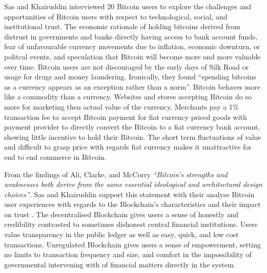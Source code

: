 \documentclass[12pt]{article} %
\begin{document}
Sas and Khairuddin interviewed 20 Bitcoin users to explore the challenges and opportunities of Bitcoin users with respect to technological, social, and institutional trust\cite{sas2016design}. The economic rationale of holding bitcoins derived from distrust in governments and banks directly having access to bank account funds, fear of unfavourable currency movements due to inflation, economic downturn, or politcal events, and speculation that Bitcoin will become more and more valuable over time. Bitcoin users are not discouraged by the early days of Silk Road or usage for drugs and money laundering. Ironically, they found ``spending bitcoins as a currency appears as an exception rather than a norm''. Bitcoin behaves more like a commodity than a currency. Websites and stores accepting Bitcoin do so more for marketing then actual value of the currency. Merchants pay a 1\% transaction fee to accept Bitcoin payment for fiat currency priced goods with payment provider to directly convert the Bitcoin to a fiat currency bank account, showing little incentive to hold their Bitcoin. The short term fluctuations of value and difficult to grasp price with regards fiat currency makes it unattractive for end to end commerce in Bitcoin.

From the findings of Ali, Clarke, and McCorry \textit{``Bitcoin’s strengths and weaknesses both derive from the same essential ideological and architectural design choices''}\cite{Ali:2015:BPU:2990603.2990632}. Sas and Khairuddin support this statement with their analyse Bitcoin user experiences with regards to the Blockchain's characteristics and their impact on trust \cite{sas2016design}. The decentralised Blockchain gives users a sense of honestly and credibility contrasted to sometimes dishonest central financial institutions. Users value transparency in the public ledger as well as easy, quick, and low cost transactions. Unregulated Blockchain gives users a sense of empowerment, setting no limits to transaction frequency and size, and comfort in the impossibility of governmental intervening with of financial matters directly in the system.
\end{document}
